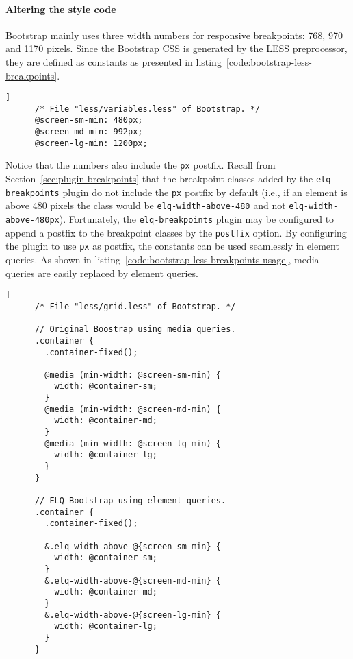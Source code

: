 \documentclass{acm_proc_article-sp}
\newcommand{\code}[1]{\texttt{#1}}
\newcommand{\gls}[1]{#1}
\begin{document}
    \paragraph{Altering the style code}
    \gls{Bootstrap} mainly uses three width numbers for \gls{responsive} breakpoints: 768, 970 and 1170 pixels.
    Since the \gls{Bootstrap} \gls{CSS} is generated by the \gls{LESS} preprocessor, they are defined as constants as presented in listing~\ref{code:bootstrap-less-breakpoints}.
    \begin{lstlisting}[gobble=8,label={code:bootstrap-less-breakpoints},caption={The main breakpoints used by \gls{Bootstrap} defined as \gls{LESS} constants.},captionpos=b]]
      /* File "less/variables.less" of Bootstrap. */
      @screen-sm-min: 480px;
      @screen-md-min: 992px;
      @screen-lg-min: 1200px;
    \end{lstlisting}
    Notice that the numbers also include the \code{px} postfix.
    Recall from Section~\ref{sec:plugin-breakpoints} that the breakpoint classes added by the \code{elq-breakpoints} plugin do not include the \code{px} postfix by default (i.e., if an element is above 480 pixels the class would be \code{elq-width-above-480} and not \code{elq-width-above-480px}).
    Fortunately, the \code{elq-breakpoints} plugin may be configured to append a postfix to the breakpoint classes by the \code{postfix} option.
    By configuring the plugin to use \code{px} as postfix, the constants can be used seamlessly in element queries.
    As shown in listing~\ref{code:bootstrap-less-breakpoints-usage}, \gls{media queries} are easily replaced by element queries.
    \begin{lstlisting}[gobble=8,label={code:bootstrap-less-breakpoints-usage},caption={Media queries can easily be replaced with element queries. By using the \code{elq-breakpoints} postfix option; the breakpoint constants can be used directly in the selectors. Notice that only three lines have been altered.},captionpos=b]]
      /* File "less/grid.less" of Bootstrap. */

      // Original Boostrap using media queries.
      .container {
        .container-fixed();

        @media (min-width: @screen-sm-min) {
          width: @container-sm;
        }
        @media (min-width: @screen-md-min) {
          width: @container-md;
        }
        @media (min-width: @screen-lg-min) {
          width: @container-lg;
        }
      }

      // ELQ Bootstrap using element queries.
      .container {
        .container-fixed();

        &.elq-width-above-@{screen-sm-min} {
          width: @container-sm;
        }
        &.elq-width-above-@{screen-md-min} {
          width: @container-md;
        }
        &.elq-width-above-@{screen-lg-min} {
          width: @container-lg;
        }
      }
    \end{lstlisting}
\end{document}
